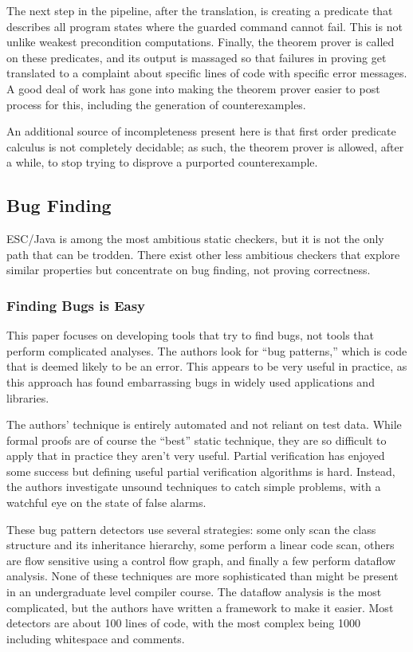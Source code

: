 \documentclass{article}
\begin{document}
\begin{multicols}{2}
The next step in the pipeline, after the translation, is creating a
predicate that describes all program states where the guarded command
cannot fail.  This is not unlike weakest precondition computations.
Finally, the theorem prover is called on these predicates, and its
output is massaged so that failures in proving get translated to a
complaint about specific lines of code with specific error messages.
A good deal of work has gone into making the theorem prover easier to
post process for this, including the generation of counterexamples.

An additional source of incompleteness present here is that first
order predicate calculus is not completely decidable; as such, the
theorem prover is allowed, after a while, to stop trying to disprove a
purported counterexample.

\subsection{Bug Finding}

ESC/Java is among the most ambitious static checkers, but it is not
the only path that can be trodden.  There exist other less ambitious
checkers that explore similar properties but concentrate on bug
finding, not proving correctness.

\subsubsection{Finding Bugs is Easy~\cite{hovemeyer04finding}}

This paper focuses on developing tools that try to find bugs, not
tools that perform complicated analyses.  The authors look for ``bug
patterns,'' which is code that is deemed likely to be an error.  This
appears to be very useful in practice, as this approach has found
embarrassing bugs in widely used applications and libraries.

The authors' technique is entirely automated and not reliant on test
data.  While formal proofs are of course the ``best'' static
technique, they are so difficult to apply that in practice they aren't
very useful.  Partial verification has enjoyed some success but
defining useful partial verification algorithms is hard.  Instead, the
authors investigate unsound techniques to catch simple problems, with
a watchful eye on the state of false alarms.

These bug pattern detectors use several strategies: some only scan the
class structure and its inheritance hierarchy, some perform a linear
code scan, others are flow sensitive using a control flow graph, and
finally a few perform dataflow analysis.  None of these techniques are
more sophisticated than might be present in an undergraduate level
compiler course.  The dataflow analysis is the most complicated, but
the authors have written a framework to make it easier.  Most
detectors are about 100 lines of code, with the most complex being
1000 including whitespace and comments.


\end{multicols}
\end{document}
